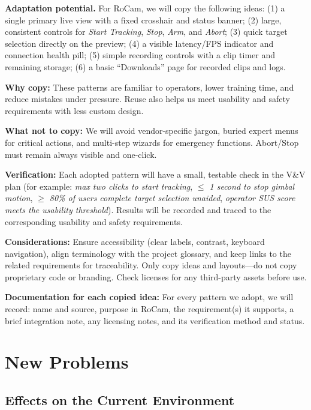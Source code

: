 \documentclass[12pt]{article}
\begin{document}
\textbf{Adaptation potential.}
For RoCam, we will copy the following ideas:
(1) a single primary live view with a fixed crosshair and status banner;
(2) large, consistent controls for \emph{Start Tracking}, \emph{Stop}, \emph{Arm}, and \emph{Abort};
(3) quick target selection directly on the preview;
(4) a visible latency/FPS indicator and connection health pill;
(5) simple recording controls with a clip timer and remaining storage;
(6) a basic “Downloads” page for recorded clips and logs.

\textbf{Why copy:}
These patterns are familiar to operators, lower training time, and reduce mistakes under pressure. Reuse also helps us meet usability and safety requirements with less custom design.

\textbf{What not to copy:}
We will avoid vendor-specific jargon, buried expert menus for critical actions, and multi-step wizards for emergency functions. Abort/Stop must remain always visible and one-click.

\textbf{Verification:}
Each adopted pattern will have a small, testable check in the V\&V plan (for example: \emph{max two clicks to start tracking}, \emph{$\leq$ 1 second to stop gimbal motion}, \emph{$\geq$ 80\% of users complete target selection unaided}, \emph{operator SUS score meets the usability threshold}). Results will be recorded and traced to the corresponding usability and safety requirements.

\textbf{Considerations:}
Ensure accessibility (clear labels, contrast, keyboard navigation), align terminology with the project glossary, and keep links to the related requirements for traceability. Only copy ideas and layouts—do not copy proprietary code or branding. Check licenses for any third-party assets before use.

\textbf{Documentation for each copied idea:}
For every pattern we adopt, we will record: name and source, purpose in RoCam, the requirement(s) it supports, a brief integration note, any licensing notes, and its verification method and status.




\section{New Problems}
\subsection{Effects on the Current Environment}
\end{document}
